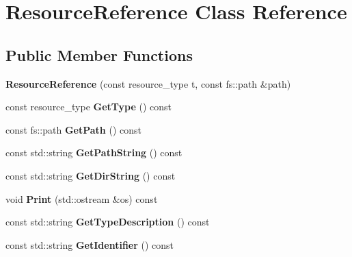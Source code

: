 \hypertarget{classResourceReference}{}\section{Resource\+Reference Class Reference}
\label{classResourceReference}
\subsection*{Public Member Functions}
\begin{DoxyCompactItemize}
\item 
\mbox{\label{classResourceReference_abb6eda4b1f7b009dc469a31460c263a3}} 
{\bfseries Resource\+Reference} (const resource\+\_\+type t, const fs\+::path \&path)
\item 
\mbox{\label{classResourceReference_af734470d0f80e54ba9fad1df7b12c0cc}} 
const resource\+\_\+type {\bfseries Get\+Type} () const
\item 
\mbox{\label{classResourceReference_ad5585ae206e71c2e43f9b3fea1da8db3}} 
const fs\+::path {\bfseries Get\+Path} () const
\item 
\mbox{\label{classResourceReference_aeca9feebcf970cc6dff4cb2ba838f49f}} 
const std\+::string {\bfseries Get\+Path\+String} () const
\item 
\mbox{\label{classResourceReference_a7162f5e59d97ba4b0b89961691cfc2da}} 
const std\+::string {\bfseries Get\+Dir\+String} () const
\item 
\mbox{\label{classResourceReference_a1b1828b321a7dc58a1516dba824b9d7c}} 
void {\bfseries Print} (std\+::ostream \&os) const
\item 
\mbox{\label{classResourceReference_a9f33d565e6030707abf11b869005079e}} 
const std\+::string {\bfseries Get\+Type\+Description} () const
\item 
\mbox{\label{classResourceReference_aebad193517f5fde52a98884293668703}} 
const std\+::string {\bfseries Get\+Identifier} () const
\item 

\end{DoxyCompactItemize}
